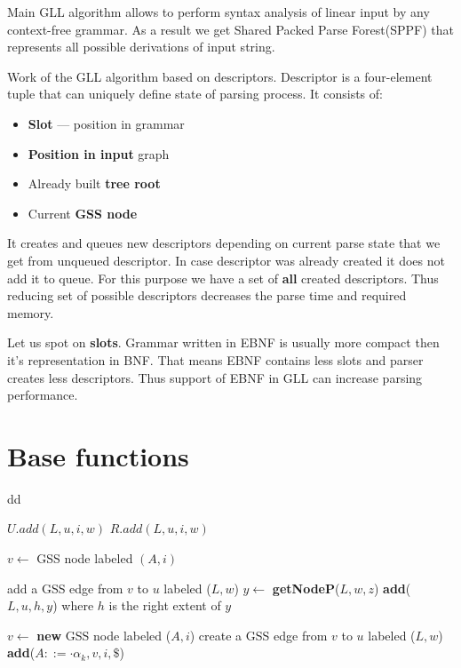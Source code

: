 \documentclass[runningheads,a4paper]{llncs}
\begin{document}
Main GLL algorithm\cite{scott2010gll} allows to perform syntax analysis of linear input by any context-free 
grammar. As a result we get Shared Packed Parse Forest(SPPF) that represents all possible derivations of input string.

Work of the GLL algorithm based on descriptors. Descriptor is a four-element tuple that can uniquely define state 
of parsing process. It consists of:
\begin{itemize}
    \item \textbf{Slot} --- position in grammar
    \item \textbf{Position in input} graph
    \item Already built \textbf{tree root}
    \item Current \textbf{GSS node}
\end{itemize}

It creates and queues new descriptors depending on current parse state that we get from unqueued descriptor. 
In case descriptor was already created it does not add it to queue. For this purpose we have a set of
\textbf{all} created descriptors. Thus reducing set of possible descriptors decreases the parse time
and required memory.

Let us spot on \textbf{slots}. Grammar written in EBNF is usually more compact then it's representation in BNF. That means EBNF contains 
less slots and parser creates less descriptors. Thus support of EBNF in GLL can increase parsing performance. 

\section{Base functions}
dd
\vspace{9cm}
\begin{algorithmic}
    \State $U.add(L,u,i,w)$
    \State $R.add(L,u,i,w)$
    \EndIf
    \EndFunction
\end{algorithmic}
    
\begin{algorithmic}    
   
    \State $v \gets$ GSS node labeled $(A, i)$
   
    \State add a GSS edge from $v$ to $u$ labeled ($L,w$)
           \State $y \gets$ \textbf{getNodeP}($L,w,z$)
           \State \textbf{add}($L, u, h, y$) where $h$ is the right extent of $y$
           \EndFor
    \EndIf
    
    \Else
    \State $v \gets$ \textbf{new} GSS node labeled ($A, i$)
    \State create a GSS edge from $v$ to $u$ labeled ($L, w$)
           \State \textbf{add}($A ::= \cdot \alpha_{k}, v, i, \$ $)
           \EndFor
           
    \EndIf
    \EndFunction
\end{algorithmic}
\end{document}
